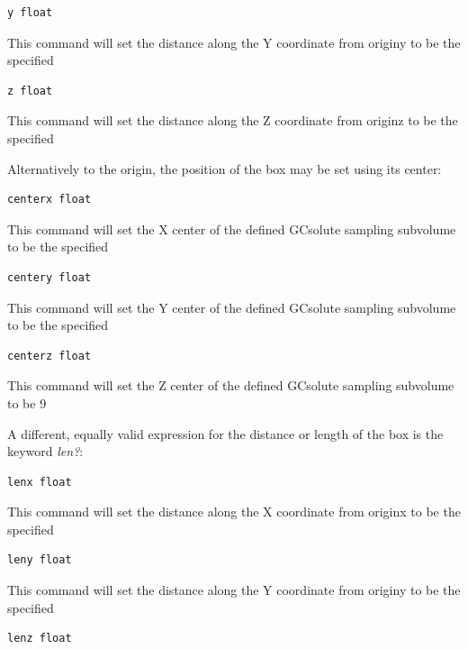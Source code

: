 \documentclass[letterpaper,10pt,english]{manual}
\begin{document}
\begin{Verbatim}[commandchars=@\[\]]
y float
\end{Verbatim}

This command will set the distance along the Y coordinate from originy to be the specified 

\begin{Verbatim}[commandchars=@\[\]]
z float
\end{Verbatim}

This command will set the distance along the Z coordinate from originz to be the specified 

Alternatively to the origin, the position of the box may be set using its center:

\begin{Verbatim}[commandchars=@\[\]]
centerx float
\end{Verbatim}

This command will set the X center of the defined GCsolute sampling subvolume to be the specified 

\begin{Verbatim}[commandchars=@\[\]]
centery float
\end{Verbatim}

This command will set the Y center of the defined GCsolute sampling subvolume to be the specified 

\begin{Verbatim}[commandchars=@\[\]]
centerz float
\end{Verbatim}

This command will set the Z center of the defined GCsolute sampling subvolume to be 9

A different, equally valid expression for the distance or length of the box is the keyword \emph{len?}:

\begin{Verbatim}[commandchars=@\[\]]
lenx float
\end{Verbatim}

This command will set the distance along the X coordinate from originx to be the specified 

\begin{Verbatim}[commandchars=@\[\]]
leny float
\end{Verbatim}

This command will set the distance along the Y coordinate from originy to be the specified 

\begin{Verbatim}[commandchars=@\[\]]
lenz float
\end{Verbatim}
\end{document}
